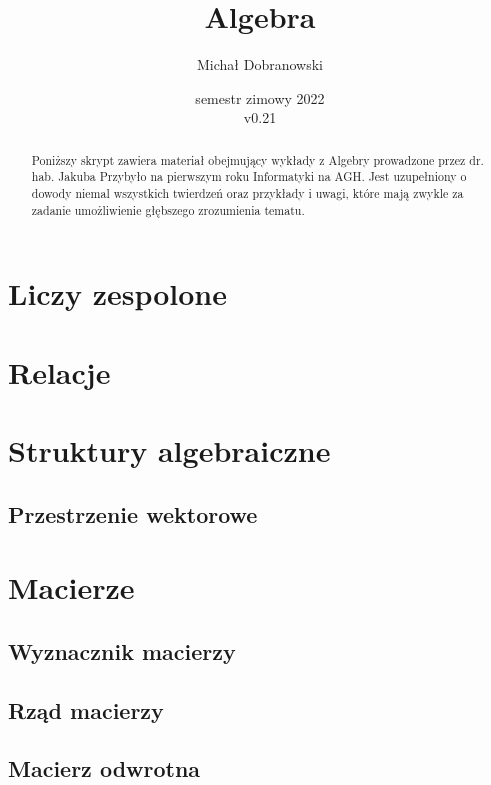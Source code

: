 \documentclass[11pt]{scrartcl}
\title{Algebra}
\author{Michał Dobranowski}
\date{semestr zimowy 2022 \\ v0.21}
\begin{document}
    \maketitle
    \begin{abstract}
        \noindent Poniższy skrypt zawiera materiał obejmujący wykłady z Algebry prowadzone przez dr. hab. Jakuba Przybyło na pierwszym roku Informatyki na AGH. Jest uzupełniony o dowody niemal wszystkich twierdzeń oraz przykłady i uwagi, które mają zwykle za zadanie umożliwienie głębszego zrozumienia tematu.
    \end{abstract}
    \tableofcontents
    \eject

    \section{Liczy zespolone}
    

    \section{Relacje}
    

    \section{Struktury algebraiczne}
    

        \subsection{Przestrzenie wektorowe}
        

    \section{Macierze}
    

        \subsection{Wyznacznik macierzy}
        

        \subsection{Rząd macierzy}
        

        \subsection{Macierz odwrotna}
        
\end{document}
